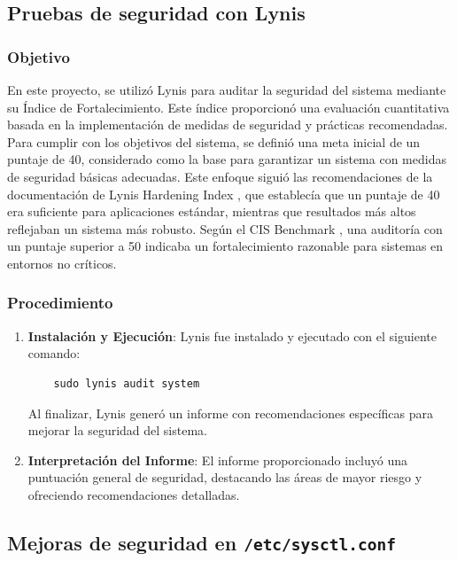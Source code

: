 \subsection{Pruebas de seguridad con Lynis}

\subsubsection{Objetivo}
En este proyecto, se utilizó Lynis para auditar la seguridad del sistema mediante su Índice de Fortalecimiento. Este índice proporcionó una evaluación cuantitativa basada en la implementación de medidas de seguridad y prácticas recomendadas. Para cumplir con los objetivos del sistema, se definió una meta inicial de un puntaje de 40, considerado como la base para garantizar un sistema con medidas de seguridad básicas adecuadas. Este enfoque siguió las recomendaciones de la documentación de Lynis Hardening Index \cite{LynisHardeningIndex}, que establecía que un puntaje de 40 era suficiente para aplicaciones estándar, mientras que resultados más altos reflejaban un sistema más robusto. Según el CIS Benchmark \cite{CISBenchmarksReport}, una auditoría con un puntaje superior a 50 indicaba un fortalecimiento razonable para sistemas en entornos no críticos.

\subsubsection{Procedimiento}
\begin{enumerate}
    \item \textbf{Instalación y Ejecución}: Lynis fue instalado y ejecutado con el siguiente comando:
    \begin{verbatim}
    sudo lynis audit system
    \end{verbatim}
    Al finalizar, Lynis generó un informe con recomendaciones específicas para mejorar la seguridad del sistema.
    
    \item \textbf{Interpretación del Informe}: El informe proporcionado incluyó una puntuación general de seguridad, destacando las áreas de mayor riesgo y ofreciendo recomendaciones detalladas. 
\end{enumerate}

\subsection{Mejoras de seguridad en \texttt{/etc/sysctl.conf}}

